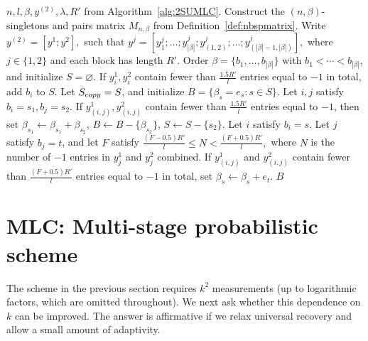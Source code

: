 \documentclass[10pt,a4paper]{amsart}
\begin{document}
\begin{algorithm}
\caption{Second-stage decoding algorithm for the two-stage MLC scheme
(see Algorithm~\ref{alg:2SUMLC} for the first stage)}
\label{alg:mlcdadec}
\begin{algorithmic}[1]
\Require $n,l,\beta,y^{(2)},\lambda,R'$ from Algorithm~\ref{alg:2SUMLC}.
\State Construct the $(n,\beta)$-singletons and pairs matrix $M_{n,\beta}$ from Definition~\ref{def:nbspmatrix}.
\State Write
\(
y^{(2)}=[y^1;y^2],\) such that \(
y^j=[y_1^j;\ldots;y_{|\beta|}^j;
y_{(1,2)}^j;\ldots;y_{(|\beta|-1,|\beta|)}^j],
\)
where $j\in\{1,2\}$ and each block has length $R'$.
\State Order $\beta=\{b_1,\ldots,b_{|\beta|}\}$ with $b_1<\cdots<b_{|\beta|}$, and initialize $S=\varnothing$.
    \State If $y_i^1,y_i^2$ contain fewer than $\frac{1.5R'}{l}$ entries equal to $-1$ in total, add $b_i$ to $S$.
\EndFor
\State Let $S_{\rm copy}=S$, and initialize $B=\{\beta_s=e_s:s\in S\}$.
    \State Let $i,j$ satisfy $b_i=s_1,b_j=s_2$. If $y_{(i,j)}^1,y_{(i,j)}^2$ contain fewer than $\frac{1.5R'}{l}$ entries equal to $-1$, then set $\beta_{s_1}\leftarrow\beta_{s_1}+\beta_{s_2}$, $B\leftarrow B-\{\beta_{s_2}\}$, $S\leftarrow S-\{s_2\}$.
\EndFor
{}
    \State Let $i$ satisfy $b_i=s$.
        \State Let $j$ satisfy $b_j=t$, and let $F$ satisfy
        \(
        \frac{(F-0.5)R'}{l}\leq N<\frac{(F+0.5)R'}{l},
        \)
        where $N$ is the number of $-1$ entries in $y_j^1$ and $y_j^2$ combined. If $y_{(i,j)}^1$ and $y_{(i,j)}^2$ contain fewer than
        $\frac{(F+0.5)R'}{l}$ entries equal to $-1$ in total, set
        $\beta_s\leftarrow\beta_s+e_t$.
    \EndFor
\EndFor
\State \Return $B$
\end{algorithmic}
\end{algorithm}

\section{MLC: Multi-stage probabilistic scheme}\label{sec:3SPMLC} 
The scheme in the previous section requires $k^2$ measurements (up to logarithmic factors, which are omitted throughout). We next ask whether this dependence on $k$ can be improved. The answer is affirmative if we relax universal recovery and allow a small amount of adaptivity.
\end{document}
